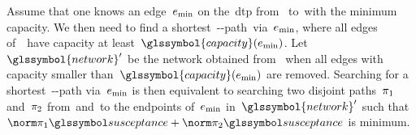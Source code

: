 % 
Assume that one knows an edge~$e_{\min}$ on the~\gls{dtp} from~\source
to~\sink with the minimum capacity. We then need to find a
shortest~\source-\sink-path~\pathu via~$e_{\min}$, where all edges
of~\pathu\ have capacity at least~$\glssymbol{capacity}(\edge_{\min})$.
Let~$\glssymbol{network}'$ be the network obtained from~ when
all edges with capacity smaller than~$\glssymbol{capacity}(\edge_{\min})$ are
removed. Searching for a shortest~\source-\sink-path via~$e_{\min}$ is then
equivalent to searching two disjoint paths~$\pi_1$ and~$\pi_2$
from~\source and~\sink to the endpoints of~$e_{\min}$
in~$\glssymbol{network}'$ such that~$\bnorm{\pathu_1}+\bnorm{\pathu_{2}}$ is
minimum.

